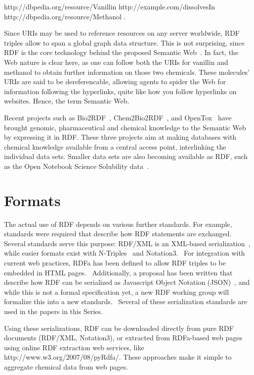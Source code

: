 \documentclass[10pt]{bmc_article}
\newenvironment{bmcformat}{\begin{raggedright}\baselineskip20pt\sloppy\setboolean{publ}{false}}{\end{raggedright}\baselineskip20pt\sloppy}
\begin{document}
\begin{bmcformat}
http://dbpedia.org/resource/Vanillin http://example.com/dissolvesIn http://dbpedia.org/resource/Methanol .

Since URIs may be used to reference resources on any server worldwide,
RDF triples allow to span a global graph data structure. 
This is not surprising, since RDF is the core technology behind the
proposed Semantic Web~\cite{BER2001}. In fact, the Web
nature is clear here, as one can follow both the URIs for vanillin and methanol to
obtain further information on those two chemicals. These molecules' URIs are said to be
dereferencable, allowing agents to spider the Web for information following
the hyperlinks, quite like how you follow hyperlinks on websites. Hence, the term Semantic Web.

Recent projects such as Bio2RDF~\cite{BEL2008}, Chem2Bio2RDF~\cite{CHE2010},
and OpenTox~\cite{Hardy2010} have brought genomic, pharmaceutical and
chemical knowledge to the Semantic Web by expressing it in RDF.
These three projects aim at making databases with chemical knowledge
available from a central access point, interlinking the individual
data sets. Smaller data sets are also becoming available as RDF, such as
the Open Notebook Science Solubility data~\cite{citeulike:5441072}. 

\section{Formats}

The actual use of RDF depends on various further standards. For example, standards were required
that describe how RDF statements are exchanged. Several standards
serve this purpose: RDF/XML is an XML-based serialization~\cite{Beckett2004}, while
easier formats exist with N-Triples~\cite{Beckett2004b} and Notation3.~\cite{BernersLee2006} For integration with
current web practices, RDFa has been defined to allow RDF triples to be embedded
in HTML pages.~\cite{RDFA2008} Additionally, a proposal has been written that
describe how RDF can be serialized as Javascript Object Notation (JSON)~\cite{Alexander2008}, and
while this is not a formal specification yet,
a new RDF working group will formalize this into a new standards.~\cite{Herman2010} Several
of these serialization standards are used in the papers in this Series.

Using these serializations, RDF can be downloaded directly from pure RDF
documents (RDF/XML, Notation3), or extracted from RDFa-based web pages using
online RDF extraction web services, like http://www.w3.org/2007/08/pyRdfa/.
These approaches make it simple to aggregate chemical data from web pages.


\end{bmcformat}
\end{document}
